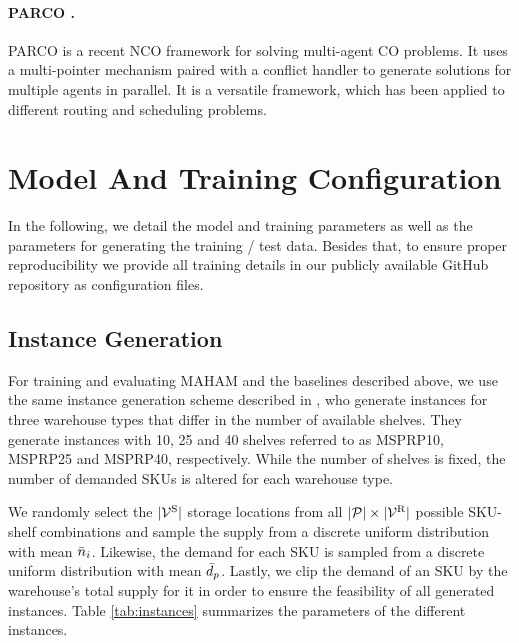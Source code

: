 \paragraph{PARCO \cite{berto2024parco}.}
PARCO is a recent NCO framework for solving multi-agent CO problems. It uses a multi-pointer mechanism paired with a conflict handler to generate solutions for multiple agents in parallel. It is a versatile framework, which has been applied to different routing and scheduling problems. 






\section{Model And Training Configuration}

In the following, we detail the model and training parameters as well as the parameters for generating the training / test data. Besides that, to ensure proper reproducibility we provide all training details in our publicly available GitHub repository as configuration files. 


\subsection{Instance Generation}
\label{appendix:instance}
For training and evaluating MAHAM and the baselines described above, we use the same instance generation scheme described in \cite{luttmann2024neural}, who generate instances for three warehouse types that differ in the number of available shelves. They generate instances with 10, 25 and 40 shelves referred to as MSPRP10, MSPRP25 and MSPRP40, respectively. While the number of shelves is fixed, the number of demanded SKUs is altered for each warehouse type.

We randomly select the $|\mathcal{V}^{\text{S}}|$ storage locations from all $|\mathcal{P}| \times |\mathcal{V}^{\mathrm{R}}|$ possible SKU-shelf combinations and sample the supply from a discrete uniform distribution with mean $\Bar{n}_i$. Likewise, the demand for each SKU is sampled from a discrete uniform distribution with mean $\Bar{d}_p$. Lastly, we clip the demand of an SKU by the warehouse's total supply for it in order to ensure the feasibility of all generated instances. 
Table \ref{tab:instances} summarizes the parameters of the different instances. 






